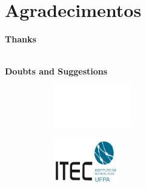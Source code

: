 \section{Agradecimentos}
\begin{frame}

    \centering
    \vspace{2cm}

    \textbf{\Huge Thanks}

    \ \\

    \textbf{Doubts and Suggestions}
    \ \\


    \vspace{.5cm}
    \begin{figure}
        \centering
        \begin{subfigure}{0.2\textwidth}
            \centering
            \includegraphics[height=1.8cm]{lib/logos/Brasao-UFPA-com-descritivo-branco.png}
        \end{subfigure}%
        \qquad
        \begin{subfigure}{0.2\textwidth}
            \centering
            \includegraphics[height=2cm]{lib/logos/itec-ufpa-logo}
        \end{subfigure}

    \end{figure}

\end{frame}
